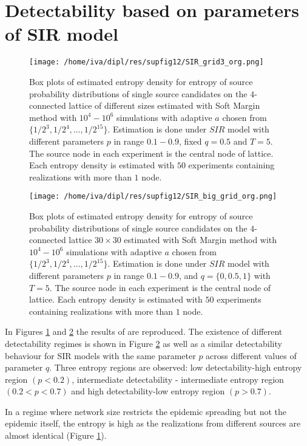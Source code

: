 \documentclass[times, utf8, diplomski]{fer}
\begin{document}
\section{Detectability based on parameters of SIR model}
\begin{figure}[H]
\texttt{[image: /home/iva/dipl/res/supfig12/SIR\_grid3\_org.png]}
\caption{Box plots of estimated entropy density for entropy of source probability distributions of 
single source candidates on the $4$-connected lattice of different sizes estimated with Soft Margin method with $10^4 - 10^6$ simulations with adaptive $a$ chosen from $\{1/2^3, 1/2^4, \ldots, 1/2^{15}\}$. Estimation is done under $SIR$ model with different parameters $p$ in range $0.1 - 0.9$, fixed $q = 0.5$ and $T = 5$. The source node in each experiment is the central node of lattice. Each entropy density is estimated with $50$ experiments containing realizations with more than $1$ node.}
\label{network_size}
\end{figure}

\begin{figure}[H]
\texttt{[image: /home/iva/dipl/res/supfig12/SIR\_big\_grid\_org.png]}
\caption{Box plots of estimated entropy density for entropy of source probability distributions of 
single source candidates on the $4$-connected lattice $30 \times 30$ estimated with Soft Margin method with $10^4 - 10^6$ simulations with adaptive $a$ chosen from $\{1/2^3, 1/2^4, \ldots, 1/2^{15}\}$. Estimation is done under $SIR$ model with different parameters $p$ in range $0.1 - 0.9$, and $q = \{0, 0.5, 1\}$ with $T = 5$. The source node in each experiment is the central node of lattice. Each entropy density is estimated with $50$ experiments containing realizations with more than $1$ node.}
\label{entropy_zones}
\end{figure}

In Figures \ref{network_size} and \ref{entropy_zones} the results of \cite{Nino} are reproduced. The existence of different detectability regimes is shown in Figure \ref{entropy_zones} as well as a similar detectability behaviour for SIR models with the same parameter $p$ across different values of parameter $q$.  Three entropy regions are observed: low detectability-high entropy region $(p < 0.2)$, intermediate detectability - intermediate entropy region $(0.2 < p < 0.7)$ and high detectability-low entropy region $(p > 0.7)$.

In a regime where network size restricts the epidemic spreading but not the epidemic itself, the entropy is high as the realizations from different sources are almost identical (Figure \ref{network_size}).
\end{document}
